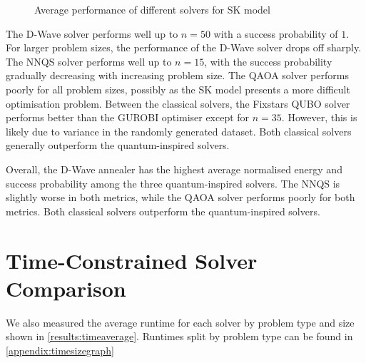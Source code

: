 \begin{figure}[!htb]
    \centering
    \hspace{30px}
    \caption{Average performance of different solvers for SK model}
    \label{all-skmodel-average}
\end{figure}

The D-Wave solver performs well up to $n=50$ with a success probability of $1$. For larger problem sizes, the performance of the D-Wave solver drops off sharply. The NNQS solver performs well up to $n=15$, with the success probability gradually decreasing with increasing problem size. The QAOA solver performs poorly for all problem sizes, possibly as the SK model presents a more difficult optimisation problem. Between the classical solvers, the Fixstars QUBO solver performs better than the GUROBI optimiser except for $n=35$. However, this is likely due to variance in the randomly generated dataset. Both classical solvers generally outperform the quantum-inspired solvers.

Overall, the D-Wave annealer has the highest average normalised energy and success probability among the three quantum-inspired solvers. The NNQS is slightly worse in both metrics, while the QAOA solver performs poorly for both metrics. Both classical solvers outperform the quantum-inspired solvers.

\section{Time-Constrained Solver Comparison}
We also measured the average runtime for each solver by problem type and size shown in \autoref{results:timeaverage}. Runtimes split by problem type can be found in \autoref{appendix:timesizegraph}

